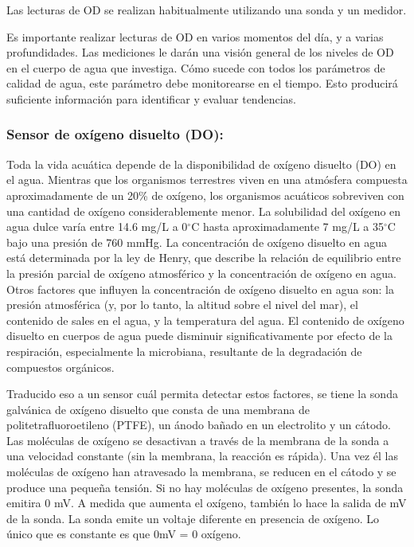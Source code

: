 Las lecturas de OD se realizan habitualmente utilizando una sonda y un medidor.

Es importante realizar lecturas de OD en varios momentos del día, y a varias profundidades. 
Las mediciones le darán una visión general de los niveles de OD en el cuerpo de agua que investiga. 
Cómo sucede con todos los parámetros de calidad de agua, este parámetro debe monitorearse en el tiempo. 
Esto producirá suficiente información para identificar y evaluar tendencias.

\subsubsection{Sensor de ox\'igeno disuelto (DO):}
Toda la vida acuática depende de la disponibilidad de oxígeno disuelto (DO) en el agua. 
Mientras que los organismos terrestres viven en una atmósfera compuesta aproximadamente de un 20\% de ox\'igeno, los organismos acuáticos sobreviven con una cantidad de ox\'igeno considerablemente menor. 
La solubilidad del ox\'igeno en agua dulce var\'ia entre 14.6 mg/L a 0$^{\circ}$C hasta aproximadamente 7 mg/L a 35$^{\circ}$C bajo una presión de 760 mmHg. La concentración de oxígeno disuelto en agua está determinada por la ley de Henry, que describe la relación de equilibrio entre la presión parcial de oxígeno atmosférico y la concentración de oxígeno en agua. 
Otros factores que influyen la concentración de oxígeno disuelto en agua son: la presión atmosférica (y, por lo tanto, la altitud sobre el nivel del mar), el contenido de sales en el agua, y la temperatura del agua. 
El contenido de ox\'igeno disuelto en cuerpos de agua puede disminuir significativamente por efecto de la respiración, especialmente la microbiana, resultante de la degradación de compuestos orgánicos. 

Traducido eso a un sensor cu\'al permita detectar estos factores, se tiene la sonda galvánica de ox\'igeno disuelto que consta de una membrana de politetrafluoroetileno (PTFE), un ánodo bañado en un electrolito y un cátodo. 
Las mol\'eculas de oxígeno se desactivan a través de la membrana de la sonda a una velocidad constante (sin la membrana, la reacción es rápida). 
Una vez \'el las mol\'eculas de ox\'igeno han atravesado la membrana, se reducen en el c\'atodo y se produce una pequeña tensión. 
Si no hay moléculas de ox\'igeno presentes, la sonda emitira 0 mV. 
A medida que aumenta el ox\'igeno, tambi\'en lo hace la salida de mV de la sonda. La sonda emite un voltaje diferente en presencia de ox\'igeno. Lo \'unico que es constante es que 0mV = 0 ox\'igeno.




